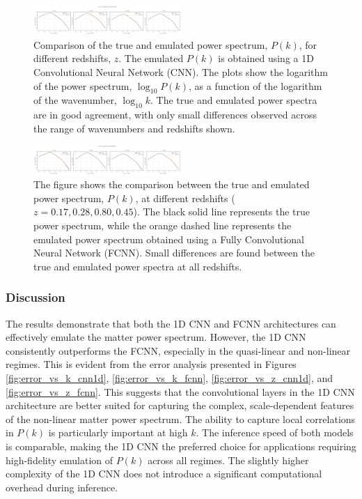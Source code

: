 \documentclass[twocolumn]{aastex631}
\begin{document}
\begin{figure}[h]
    \centering
    \includegraphics[width=0.5\textwidth]{../Project4/plots/true_vs_emulated_cnn1d_1_1745408311.png}
    \caption{\label{fig:true_vs_emulated_cnn1d}Comparison of the true and emulated power spectrum, $P(k)$, for different redshifts, $z$. The emulated $P(k)$ is obtained using a 1D Convolutional Neural Network (CNN). The plots show the logarithm of the power spectrum, $\log_{10} P(k)$, as a function of the logarithm of the wavenumber, $\log_{10} k$. The true and emulated power spectra are in good agreement, with only small differences observed across the range of wavenumbers and redshifts shown.}
\end{figure}

\begin{figure}[h]
    \centering
    \includegraphics[width=0.5\textwidth]{../Project4/plots/true_vs_emulated_fcnn_2_1745408315.png}
    \caption{\label{fig:true_vs_emulated_fcnn}The figure shows the comparison between the true and emulated power spectrum, $P(k)$, at different redshifts ($z=0.17, 0.28, 0.80, 0.45$). The black solid line represents the true power spectrum, while the orange dashed line represents the emulated power spectrum obtained using a Fully Convolutional Neural Network (FCNN). Small differences are found between the true and emulated power spectra at all redshifts.}
\end{figure}

\subsubsection{Discussion}

The results demonstrate that both the 1D CNN and FCNN architectures can effectively emulate the matter power spectrum. However, the 1D CNN consistently outperforms the FCNN, especially in the quasi-linear and non-linear regimes. This is evident from the error analysis presented in Figures \ref{fig:error_vs_k_cnn1d}, \ref{fig:error_vs_k_fcnn}, \ref{fig:error_vs_z_cnn1d}, and \ref{fig:error_vs_z_fcnn}. This suggests that the convolutional layers in the 1D CNN architecture are better suited for capturing the complex, scale-dependent features of the non-linear matter power spectrum. The ability to capture local correlations in $P(k)$ is particularly important at high $k$. The inference speed of both models is comparable, making the 1D CNN the preferred choice for applications requiring high-fidelity emulation of $P(k)$ across all regimes. The slightly higher complexity of the 1D CNN does not introduce a significant computational overhead during inference.
\end{document}
